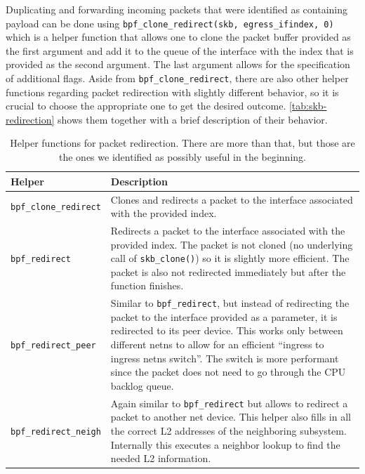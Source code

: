 \noindent
Duplicating and forwarding incoming packets that were identified as containing payload can be done 
using \verb|bpf_clone_redirect(skb, egress_ifindex, 0)| which is a helper function
that allows one to clone the packet buffer provided as the first argument and add it to the 
queue of the interface with the index that is provided as the second argument.
The last argument allows for the specification of additional flags.
Aside from \verb|bpf_clone_redirect|, there are also other helper functions regarding packet
redirection with slightly different behavior, so it is crucial to choose the appropriate one
to get the desired outcome.
\autoref{tab:skb-redirection} shows them together with a brief description of their behavior.

\begin{table}[H]
    \centering
    \begin{tabular}{L{7cm}L{7cm}}
        \toprule
            Helper & Description \\
        \midrule
            \verb|bpf_clone_redirect| & Clones and redirects a packet to the interface associated with the provided index.\\
        \midrule
            \verb|bpf_redirect| & Redirects a packet to the interface associated with the provided index. The packet is not cloned 
                                    (no underlying call of \verb|skb_clone()|) so it is slightly more efficient.
                                    The packet is also not redirected immediately but after the function finishes.\\ 
        \midrule
            \verb|bpf_redirect_peer| & Similar to \verb|bpf_redirect|, but instead of redirecting the packet to the interface provided 
                                        as a parameter, it is redirected to its peer device. This works only between different netns to 
                                        allow for an efficient ``ingress to ingress netns switch''. The switch is more performant since 
                                        the packet does not need to go through the CPU backlog queue.\\ %
        \midrule
            \verb|bpf_redirect_neigh| & Again similar to \verb|bpf_redirect| but allows to redirect a packet to another net device. 
                                        This helper also fills in all the correct L2 addresses of the neighboring subsystem. 
                                        Internally this executes a neighbor lookup to find the needed L2 information. \\
        \bottomrule
    \end{tabular}
    \caption[Redirection helpers for packet buffer]{Helper functions for packet redirection.
    There are more than that, but those are the ones we identified as possibly useful 
    in the beginning.}\label{tab:skb-redirection}
\end{table}
